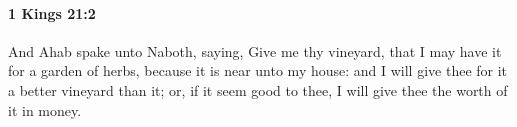 
		\paragraph{1 Kings 21:2} %
			\label{1KINGS-21-2}

			And Ahab spake unto Naboth, saying, Give me thy vineyard, that I may have it for a garden of herbs, because it is near unto my house: and I will give thee for it a better vineyard than it; or, if it seem good to thee, I will give thee the worth of it in money.


